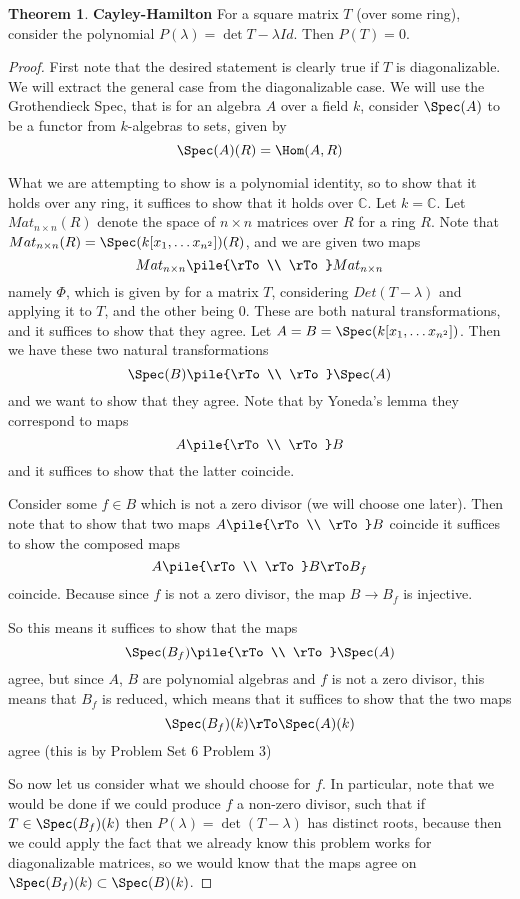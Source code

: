 \documentclass[12 pt]{article}
\theoremstyle{definition}
\newtheorem{thm}{Theorem}[section]
\renewcommand{\(}{\left(}
\renewcommand{\)}{\right)}
\newcommand\cc{\mathbb{C}}
\begin{document}
\begin{thm} \textbf{Cayley-Hamilton} For a square matrix $T$ (over some ring), consider the polynomial $P(\lambda)=\det{T-\lambda Id}$. Then $P(T)=0$.
\end{thm}
\begin{proof}
First note that the desired statement is clearly true if $T$ is diagonalizable. We will extract the general case from the diagonalizable case. We will use the Grothendieck Spec, that is for an algebra $A$ over a field $k$, consider $\Spec(A)$ to be a functor from $k$-algebras to sets, given by
\[\Spec(A)(R)=\Hom(A,R)\]

What we are attempting to show is a polynomial identity, so to show that it holds over any ring, it suffices to show that it holds over $\cc$. Let $k=\cc$.  Let $Mat_{n\times n}(R)$ denote the space of $n \times n$ matrices over $R$ for a ring $R$. Note that $Mat_{n \times n}(R)=\Spec(k[x_1, \ldots x_{n^2}])(R)$, and we are given two maps
\[Mat_{n \times n} \pile{\rTo \\ \rTo} Mat_{n \times n}\]
namely $\Phi$, which is given by for a matrix $T$, considering $Det(T-\lambda)$ and applying it to $T$, and the other being 0. These are both natural transformations, and it suffices to show that they agree. Let $A=B=\Spec(k[x_1, \ldots x_{n^2}])$. Then we have these two natural transformations
\[\Spec(B) \pile{\rTo \\ \rTo} \Spec(A)\]
and we want to show that they agree. Note that by Yoneda's lemma they correspond to maps
\[A \pile{\rTo \\ \rTo} B\]
and it suffices to show that the latter coincide.

Consider some $f \in B$ which is not a zero divisor (we will choose one later). Then note that to show that two maps $A \pile{\rTo \\ \rTo} B$ coincide it suffices to show the composed maps
\[A \pile{\rTo \\ \rTo} B \rTo B_f\]
coincide. Because since $f$ is not a zero divisor, the map $B \to B_f$ is injective.

So this means it suffices to show that the maps
\[\Spec(B_f) \pile{\rTo \\ \rTo} \Spec(A)\]
agree, but since $A$, $B$ are polynomial algebras and $f$ is not a zero divisor, this means that $B_f$ is reduced, which means that it suffices to show that the two maps
\[\Spec(B_f)(k) \rTo \Spec(A)(k)\]
agree (this is by Problem Set 6 Problem 3)

So now let us consider what we should choose for $f$. In particular, note that we would be done if we could produce $f$ a non-zero divisor, such that if $T \in \Spec(B_f)(k)$ then $P(\lambda)=\det(T-\lambda)$ has distinct roots, because then we could apply the fact that we already know this problem works for diagonalizable matrices, so we would know that the maps agree on $\Spec(B_f)(k) \subset \Spec(B)(k)$.


\end{proof}
\end{document}

